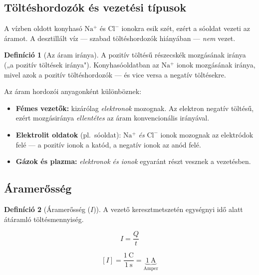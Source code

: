 \documentclass{article}
\theoremstyle{definition}
\newtheorem{definition}{Definíció}
\begin{document}
\subsection{Töltéshordozók és vezetési típusok}

A vízben oldott konyhasó $\mathrm{Na^{+}}$ és $\mathrm{Cl^{-}}$ ionokra
esik szét, ezért a sóoldat vezeti az áramot. A desztillált víz — szabad
töltéshordozók hiányában — \emph{nem} vezet.

\begin{definition}[Az áram iránya]
    A pozitív töltésű részecskék mozgásának iránya
    („a pozitív töltések iránya"). Konyhasóoldatban az
    $\mathrm{Na^{+}}$ ionok mozgásának iránya, mivel azok a pozitív
    töltéshordozók — és vice versa a negatív töltésekre.
\end{definition}

Az áram hordozói anyagonként különböznek:

\begin{itemize}
    \item \textbf{Fémes vezetők:} kizárólag \emph{elektronok} mozognak.
          Az elektron negatív töltésű, ezért mozgásiránya
          \emph{ellentétes} az áram konvencionális irányával.
    \item \textbf{Elektrolit oldatok} (pl.\ sóoldat):
          $\mathrm{Na^{+}}$ \emph{és} $\mathrm{Cl^{-}}$ ionok mozognak az
          elektródok felé — a pozitív ionok a katód, a negatív ionok az
          anód felé.
    \item \textbf{Gázok és plazma:} \emph{elektronok és ionok} egyaránt
          részt vesznek a vezetésben.
\end{itemize}

\subsection{Áramerősség}

\begin{definition}[Áramerősség ($I$)]
    A vezető keresztmetszetén egységnyi idő alatt átáramló
    töltésmennyiség.
\end{definition}

\[
    I = \frac{Q}{t}
\]

\[
    [I]
    = \frac{\SI{1}{\coulomb}}{\SI{1}{\second}}
    = \underbrace{\SI{1}{\ampere}}_{\text{Amper}}
\]
\end{document}

